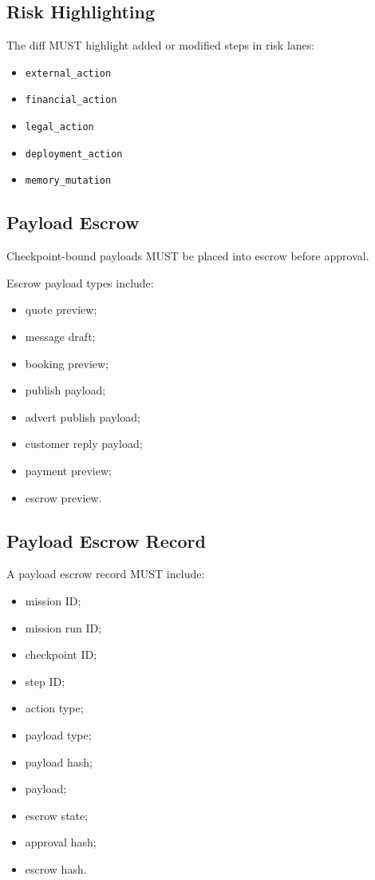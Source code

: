 \subsection{Risk Highlighting}

The diff MUST highlight added or modified steps in risk lanes:

\begin{itemize}
  \item \texttt{external\_action}
  \item \texttt{financial\_action}
  \item \texttt{legal\_action}
  \item \texttt{deployment\_action}
  \item \texttt{memory\_mutation}
\end{itemize}

\subsection{Payload Escrow}

Checkpoint-bound payloads MUST be placed into escrow before approval.

Escrow payload types include:

\begin{itemize}
  \item quote preview;
  \item message draft;
  \item booking preview;
  \item publish payload;
  \item advert publish payload;
  \item customer reply payload;
  \item payment preview;
  \item escrow preview.
\end{itemize}

\subsection{Payload Escrow Record}

A payload escrow record MUST include:

\begin{itemize}
  \item mission ID;
  \item mission run ID;
  \item checkpoint ID;
  \item step ID;
  \item action type;
  \item payload type;
  \item payload hash;
  \item payload;
  \item escrow state;
  \item approval hash;
  \item escrow hash.
\end{itemize}

